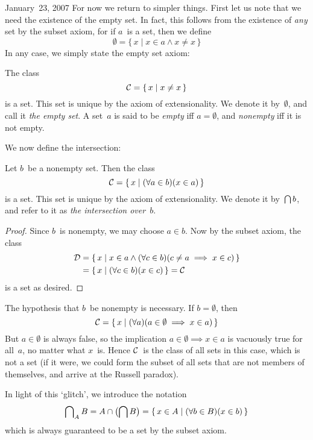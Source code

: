 \begin{lecture}{January~23, 2007}
For now we return to simpler things. First let us note that we need the existence of the empty set. In fact, this follows from the existence of \emph{any} set by the subset axiom, for if \(a\)~is a set, then we define
\[\emptyset=\{\,x\mid x\in a\land x\ne x\,\}\]
In any case, we simply state the empty set axiom:
\begin{axm}
The class
\[\mathcal{C}=\{\,x\mid x\ne x\,\}\]
is a set. This set is unique by the axiom of extensionality. We denote it by~\(\emptyset\), and call it \emph{the empty set}. A set~\(a\) is said to be \emph{empty} iff \(a=\emptyset\), and \emph{nonempty} iff it is not empty.
\end{axm}

We now define the intersection:
\begin{thm}
Let \(b\)~be a nonempty set. Then the class
\[\mathcal{C}=\{\,x\mid (\forall a\in b)(x\in a)\,\}\]
is a set. This set is unique by the axiom of extensionality. We denote it by~\(\bigcap b\), and refer to it as \emph{the intersection over~\(b\)}.
\end{thm}
\begin{proof}
Since \(b\)~is nonempty, we may choose \(a\in b\). Now by the subset axiom, the class
\begin{align*}
\mathcal{D}&=\{\,x\mid x\in a\land(\forall c\in b)(c\ne a\implies x\in c)\,\}\\
&=\{\,x\mid(\forall c\in b)(x\in c)\,\}=\mathcal{C}
\end{align*}
is a set as desired.
\end{proof}
\noindent The hypothesis that \(b\)~be nonempty is necessary. If \(b=\emptyset\), then
\[\mathcal{C}=\{\,x\mid(\forall a)(a\in\emptyset\implies x\in a)\,\}\]
But \(a\in\emptyset\) is always false, so the implication \(a\in\emptyset\implies x\in a\) is vacuously true for all~\(a\), no matter what \(x\)~is. Hence \(\mathcal{C}\)~is the class of all sets in this case, which is not a set (if it were, we could form the subset of all sets that are not members of themselves, and arrive at the Russell paradox).

In light of this `glitch', we introduce the notation
\[\bigcap\nolimits_A B=A\cap\bigl(\bigcap B\bigr)=\{\,x\in A\mid(\forall b\in B)(x\in b)\,\}\]
which is always guaranteed to be a set by the subset axiom.
\end{lecture}

